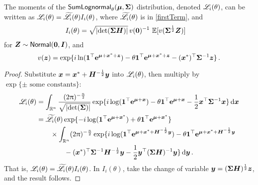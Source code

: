 \begin{subappendices}
\begin{proposition} \label{prop:laplace_derivatives}
The moments of the $\mathsf{SumLognormal}_\theta(\bm{\mu}, \bm{\Sigma})$ distribution, denoted $\mathscr{L}_i(\theta)$, can be written as $\mathscr{L}_i(\theta) = \widetilde{\mathscr{L}}_i(\theta) I_i(\theta)$, where $\widetilde{\mathscr{L}}_i(\theta)$ is in \eqref{firstTerm}, and
\begin{align*}
	I_i(\theta) &= \sqrt{\lvert \det(\bm{\Sigma} \bm{H})\rvert} \, v(\bm{0})^{-1} \, \operatorname{{\mathbb E}}[v(\bm{\Sigma}^{\frac12} \bm{Z})]
\end{align*}
for $\bm{Z} \sim \mathsf{Normal}(\bm{0}, \bm{I})$, and
\[ v(\bm{z}) = \exp\{ i \ln(\bm{1}^\top \text{\bf{e}}^{\bm{\mu} + \bm{x}^* + \bm{z}}) - \theta \bm{1}^\top \text{\bf{e}}^{\bm{\mu} + \bm{x}^* + \bm{z}} - (\bm{x}^*)^\top \bm{\Sigma}^{-1} \bm{z} \} \,. \]
\end{proposition}
\begin{proof}
Substitute $\bm{x} = \bm{x}^* + \bm{H}^{-\frac12} \bm{y}$ into $\mathscr{L}_i(\theta)$, then multiply by $\exp\{ \pm \text{ some constants}\}$:
\begin{align*}
	\mathscr{L}_i(\theta) &= \int_{\mathbb{R}^n} \frac{ (2\uppi)^{-\frac{n}{2}} }{\sqrt{\lvert \det(\bm{\Sigma})\rvert}} \exp\{ i \log(\bm{1}^\top \text{\bf{e}}^{\bm{\mu} + \bm{x}}) - \theta \bm{1}^\top \text{\bf{e}}^{\bm{\mu} + \bm{x}} - \frac12 \bm{x}^\top \bm{\Sigma}^{-1} \bm{x} \}  \mathop{}\!\mathrm{d} \bm{x} \\
	&= \widetilde{\mathscr{L}}_i(\theta) \exp\{ -i \log(\bm{1}^\top \text{\bf{e}}^{\bm{\mu} + \bm{x}^*}) + \theta \bm{1}^\top \text{\bf{e}}^{\bm{\mu} + \bm{x}^*} \} \\
	&\qquad \times \int_{\mathbb{R}^n} (2\uppi)^{-\frac{n}{2}} \exp\{ i \log(\bm{1}^\top \text{\bf{e}}^{\bm{\mu} + \bm{x}^* + \bm{H}^{-\frac12} \bm{y}}) - \theta \bm{1}^\top \text{\bf{e}}^{\bm{\mu} + \bm{x}^* + \bm{H}^{-\frac12} \bm{y}} \\
	&\qquad\qquad -(\bm{x}^*)^\top \bm{\Sigma}^{-1} \bm{H}^{-\frac12} \bm{y} - \frac12 \bm{y}^\top (\bm{\Sigma} \bm{H})^{-1} \bm{y} \}  \mathop{}\!\mathrm{d} \bm{y} \,.
\end{align*}
That is, $\mathscr{L}_i(\theta) = \widetilde{\mathscr{L}}_i(\theta) I_i(\theta)$. In $I_i(\theta)$, take the change of variable $\bm{y} = (\bm{\Sigma}\bm{H})^{\frac12} \bm{z}$, and the result follows.

\end{proof}
\end{subappendices}
